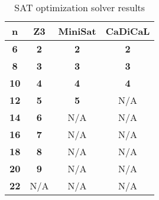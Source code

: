 \begin{table}[ht]
\centering
\begin{tabular}{|c|c|c|c|}
\toprule
\textbf{n} & \textbf{Z3} & \textbf{MiniSat} & \textbf{CaDiCaL} \\
\midrule
\textbf{6}  & \textbf{2}   & \textbf{2}   & \textbf{2}   \\
\textbf{8}  & \textbf{3}   & \textbf{3}   & \textbf{3}   \\
\textbf{10} & \textbf{4}   & \textbf{4}   & \textbf{4}   \\
\textbf{12} & \textbf{5}   & \textbf{5}   & N/A         \\
\textbf{14} & \textbf{6}   & N/A         & N/A         \\
\textbf{16} & \textbf{7}   & N/A         & N/A         \\
\textbf{18} & \textbf{8}   & N/A         & N/A         \\
\textbf{20} & \textbf{9}   & N/A         & N/A         \\
\textbf{22} & N/A          & N/A         & N/A         \\
\bottomrule
\end{tabular}
\caption{SAT optimization solver results}
\label{table:sat-results}
\end{table}


